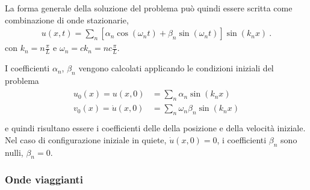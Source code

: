 \documentclass[letterpaper,10pt,italian]{jupyterBook}
\begin{document}
\sphinxAtStartPar
La forma generale della soluzione del problema può quindi essere scritta come combinazione di onde stazionarie,
\begin{equation*}
\begin{split}u(x,t) = \sum_{n} \left[ \alpha_n \cos\left( \omega_n t \right) + \beta_n \sin\left(\omega_n t\right) \right] \sin\left( k_n x \right) \ .\end{split}
\end{equation*}
\sphinxAtStartPar
con \(k_n = n\frac{\pi}{L}\) e \(\omega_n = c k_n = n c \frac{\pi}{L}\).

\sphinxAtStartPar
I coefficienti \(\alpha_n\), \(\beta_n\) vengono calcolati applicando le condizioni iniziali del problema
\begin{equation*}
\begin{split}\begin{aligned}
  u_0(x) = u(x,0)       & = \sum_{n} \alpha_n  \sin\left( k_n x \right) \\
  v_0(x) = \dot{u}(x,0) & = \sum_{n} \omega_n \beta_n  \sin\left( k_n x \right) \\
\end{aligned}\end{split}
\end{equation*}
\sphinxAtStartPar
e quindi risultano essere i coefficienti delle  della posizione e della velocità iniziale. Nel caso di configurazione iniziale in quiete, \(\dot{u}(x,0) = 0\), i coefficienti \(\beta_n\) sono nulli, \(\beta_n = 0\).
\subsubsection*{Onde viaggianti}
\end{document}
